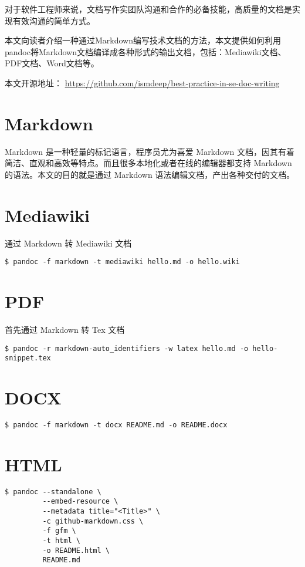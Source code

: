 对于软件工程师来说，文档写作实团队沟通和合作的必备技能，高质量的文档是实现有效沟通的简单方式。

本文向读者介绍一种通过Markdown编写技术文档的方法，本文提供如何利用pandoc将Markdown文档编译成各种形式的输出文档，包括：Mediawiki文档、PDF文档、Word文档等。

本文开源地址：
\url{https://github.com/ismdeep/best-practice-in-se-doc-writing}

\section{Markdown}

Markdown 是一种轻量的标记语言，程序员尤为喜爱 Markdown
文档，因其有着简洁、直观和高效等特点。而且很多本地化或者在线的编辑器都支持
Markdown 的语法。本文的目的就是通过 Markdown
语法编辑文档，产出各种交付的文档。

\section{Mediawiki}

通过 Markdown 转 Mediawiki 文档

\begin{verbatim}
$ pandoc -f markdown -t mediawiki hello.md -o hello.wiki
\end{verbatim}

\section{PDF}

首先通过 Markdown 转 Tex 文档

\begin{verbatim}
$ pandoc -r markdown-auto_identifiers -w latex hello.md -o hello-snippet.tex
\end{verbatim}

\section{DOCX}

\begin{verbatim}
$ pandoc -f markdown -t docx README.md -o README.docx
\end{verbatim}

\section{HTML}

\begin{verbatim}
$ pandoc --standalone \
         --embed-resource \
         --metadata title="<Title>" \
         -c github-markdown.css \
         -f gfm \
         -t html \
         -o README.html \
         README.md
\end{verbatim}
